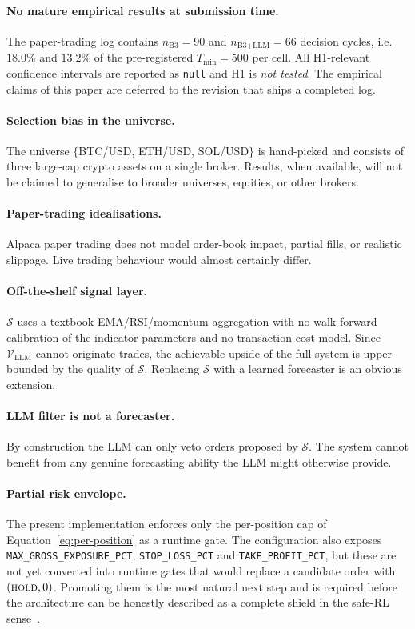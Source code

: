 \documentclass{article}
\begin{document}
\paragraph{No mature empirical results at submission time.} The paper-trading log contains $n_{\text{B3}}=90$ and $n_{\text{B3+LLM}}=66$ decision cycles, i.e.\ $18.0\%$ and $13.2\%$ of the pre-registered $T_{\min}=500$ per cell. All H1-relevant confidence intervals are reported as \texttt{null} and H1 is \emph{not tested}. The empirical claims of this paper are deferred to the revision that ships a completed log.

\paragraph{Selection bias in the universe.} The universe $\{$BTC/USD, ETH/USD, SOL/USD$\}$ is hand-picked and consists of three large-cap crypto assets on a single broker. Results, when available, will not be claimed to generalise to broader universes, equities, or other brokers.

\paragraph{Paper-trading idealisations.} Alpaca paper trading does not model order-book impact, partial fills, or realistic slippage. Live trading behaviour would almost certainly differ.

\paragraph{Off-the-shelf signal layer.} $\mathcal{S}$ uses a textbook EMA/RSI/momentum aggregation with no walk-forward calibration of the indicator parameters and no transaction-cost model. Since $\mathcal{V}_{\text{LLM}}$ cannot originate trades, the achievable upside of the full system is upper-bounded by the quality of $\mathcal{S}$. Replacing $\mathcal{S}$ with a learned forecaster is an obvious extension.

\paragraph{LLM filter is not a forecaster.} By construction the LLM can only veto orders proposed by $\mathcal{S}$. The system cannot benefit from any genuine forecasting ability the LLM might otherwise provide.

\paragraph{Partial risk envelope.} The present implementation enforces only the per-position cap of Equation~\eqref{eq:per-position} as a runtime gate. The configuration also exposes \texttt{MAX\_GROSS\_EXPOSURE\_PCT}, \texttt{STOP\_LOSS\_PCT} and \texttt{TAKE\_PROFIT\_PCT}, but these are not yet converted into runtime gates that would replace a candidate order with $(\textsc{hold},0)$. Promoting them is the most natural next step and is required before the architecture can be honestly described as a complete shield in the safe-RL sense~\cite{shielded_rl_alshiekh2018}.
\end{document}
